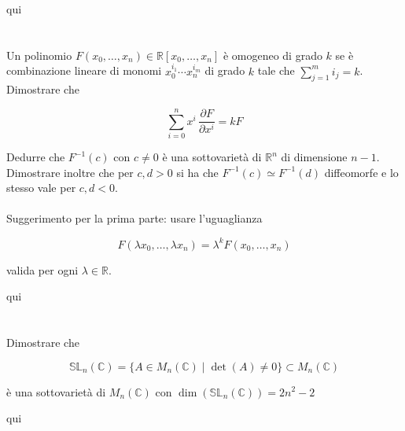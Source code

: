 qui

\tocless\section{}\label{es2-15}

\begin{tcolorbox}
	Un polinomio $ F(x_{0},\dots,x_{n}) \in \mathbb{R}[x_{0},\dots,x_{n}] $ è omogeneo di grado $ k $ se è combinazione lineare di monomi $ x_{0}^{i_{1}} \cdots x_{n}^{i_{m}} $ di grado $ k $ tale che $ \sum_{j=1}^{m} i_{j} = k $. Dimostrare che
	
	\begin{equation}
		\sum_{i=0}^{n} x^{i} \, \dfrac{\partial F}{\partial x^{i}} = k F
	\end{equation}

	Dedurre che $ F^{-1}(c) $ con $ c \neq 0 $ è una sottovarietà di $ \mathbb{R}^{n} $ di dimensione $ n-1 $. Dimostrare inoltre che per $ c,d>0 $ si ha che $ F^{-1}(c) \simeq F^{-1}(d) $ diffeomorfe e lo stesso vale per $ c,d<0 $.\\\\
	Suggerimento per la prima parte: usare l'uguaglianza
	
	\begin{equation}
		F(\lambda x_{0},\dots,\lambda x_{n}) = \lambda^{k} F(x_{0},\dots,x_{n})
	\end{equation}
	
	valida per ogni $ \lambda \in \mathbb{R} $.
\end{tcolorbox}

qui

\tocless\section{}\label{es2-16}

\begin{tcolorbox}
	Dimostrare che
	
	\begin{equation}
		\mathbb{SL}_{n}(\mathbb{C}) = \{ A \in M_{n}(\mathbb{C}) \mid \det(A) \neq 0 \} \subset M_{n}(\mathbb{C})
	\end{equation}

	è una sottovarietà di $ M_{n}(\mathbb{C}) $ con $ \dim(\mathbb{SL}_{n}(\mathbb{C})) = 2n^{2}-2  $
\end{tcolorbox}

qui

\tocless\section{}\label{es2-17}


